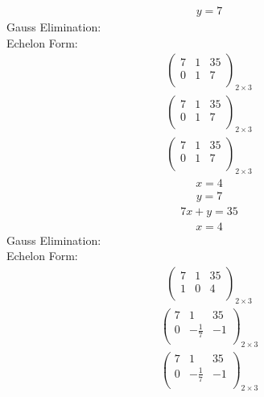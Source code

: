 \documentclass{article}
\begin{document}
\begin{align*}
y=7\end{align*}
Gauss Elimination:\\
Echelon Form:\\
\begin{align*}
\left(
\begin{array}{cc|c}
7 & 1 & 35\\
0 & 1 & 7\\
\end{array}
\right)_{2\times 3}
\end{align*}
\begin{align*}
\left(
\begin{array}{cc|c}
7 & 1 & 35\\
0 & 1 & 7\\
\end{array}
\right)_{2\times 3}
\end{align*}
\begin{align*}
\left(
\begin{array}{cc|c}
7 & 1 & 35\\
0 & 1 & 7\\
\end{array}
\right)_{2\times 3}
\end{align*}
\begin{align*}
x=4\end{align*}
\begin{align*}
y=7\end{align*}
\begin{align*}
7x + y=35\end{align*}
\begin{align*}
x=4\end{align*}
Gauss Elimination:\\
Echelon Form:\\
\begin{align*}
\left(
\begin{array}{cc|c}
7 & 1 & 35\\
1 & 0 & 4\\
\end{array}
\right)_{2\times 3}
\end{align*}
\begin{align*}
\left(
\begin{array}{cc|c}
7 & 1 & 35\\
0 & -\frac{1}{7} & -1\\
\end{array}
\right)_{2\times 3}
\end{align*}
\begin{align*}
\left(
\begin{array}{cc|c}
7 & 1 & 35\\
0 & -\frac{1}{7} & -1\\
\end{array}
\right)_{2\times 3}
\end{align*}
\end{document}
